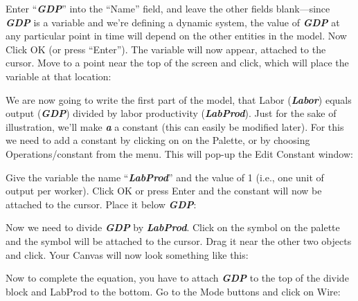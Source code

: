 \begin{center}
\end{center}

Enter ``{\em\bf GDP}'' into the ``Name'' field, and leave the other
fields blank---since {\em\bf GDP} is a variable and we're defining a
dynamic system, the value of {\em\bf GDP} at any particular point in
time will depend on the other entities in the model. Now Click OK (or
press ``Enter''). The variable will now appear, attached to the
cursor. Move to a point near the top of the screen and click, which
will place the variable at that location:

\begin{center}
\end{center}


We are now going to write the first part of the model, that Labor
({\em\bf Labor}) equals output ({\em\bf GDP}) divided by labor
productivity ({\em\bf LabProd}). Just for the sake of illustration,
we'll make {\em\bf a} a constant (this can easily be modified
later). For this we need to add a constant by clicking on  on the
Palette, or by choosing Operations/constant from the menu. This will
pop-up the Edit Constant window: 

\begin{center}
\end{center}

Give the variable the name ``{\em\bf LabProd}'' and the value of 1
(i.e., one unit of output per worker). Click OK or press Enter and the
constant   will now be attached to the
cursor. Place it below {\em\bf GDP}: 

\begin{center}
\end{center}

Now we need to divide {\em\bf GDP} by {\em\bf LabProd}. Click on the
 symbol on the palette and the symbol will
be attached to the cursor. Drag it near the other two objects and
click. Your Canvas will now look something like this: 

\begin{center}
\end{center}

Now to complete the equation, you have to attach {\em\bf GDP}  to the top of the
divide block and LabProd to the bottom. Go to the Mode buttons and
click on Wire:  


